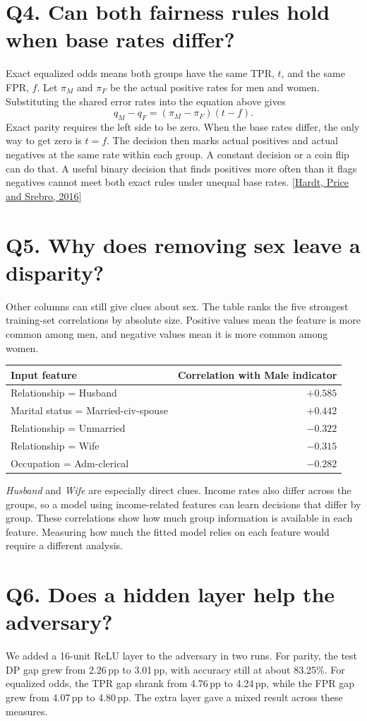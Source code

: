 \documentclass[11pt,letterpaper]{article}
\newcommand{\gap}[1]{#1\,pp}
\newcommand{\rate}[1]{#1\%}
\newcommand{\question}[2]{\section*{Q#1. #2}}
\begin{document}
\question{4}{Can both fairness rules hold when base rates differ?}

Exact equalized odds means both groups have the same TPR, \(t\), and the same FPR, \(f\). Let \(\pi_M\) and \(\pi_F\) be the actual positive rates for men and women. Substituting the shared error rates into the equation above gives
\[
q_M-q_F=(\pi_M-\pi_F)(t-f).
\]
Exact parity requires the left side to be zero. When the base rates differ, the only way to get zero is \(t=f\). The decision then marks actual positives and actual negatives at the same rate within each group. A constant decision or a coin flip can do that. A useful binary decision that finds positives more often than it flags negatives cannot meet both exact rules under unequal base rates. [\href{https://arxiv.org/abs/1610.02413}{Hardt, Price and Srebro, 2016}]

\question{5}{Why does removing sex leave a disparity?}

Other columns can still give clues about sex. The table ranks the five strongest training-set correlations by absolute size. Positive values mean the feature is more common among men, and negative values mean it is more common among women.

{\small
\begin{tabularx}{\linewidth}{@{}Lr@{}}
\toprule
Input feature & Correlation with Male indicator\\
\midrule
Relationship = Husband & $+0.585$\\
Marital status = Married-civ-spouse & $+0.442$\\
Relationship = Unmarried & $-0.322$\\
Relationship = Wife & $-0.315$\\
Occupation = Adm-clerical & $-0.282$\\
\bottomrule
\end{tabularx}\par}

\emph{Husband} and \emph{Wife} are especially direct clues. Income rates also differ across the groups, so a model using income-related features can learn decisions that differ by group. These correlations show how much group information is available in each feature. Measuring how much the fitted model relies on each feature would require a different analysis.

\newpage
\question{6}{Does a hidden layer help the adversary?}

We added a 16-unit ReLU layer to the adversary in two runs. For parity, the test DP gap grew from \gap{2.26} to \gap{3.01}, with accuracy still at about \rate{83.25}. For equalized odds, the TPR gap shrank from \gap{4.76} to \gap{4.24}, while the FPR gap grew from \gap{4.07} to \gap{4.80}. The extra layer gave a mixed result across these measures.
\end{document}
